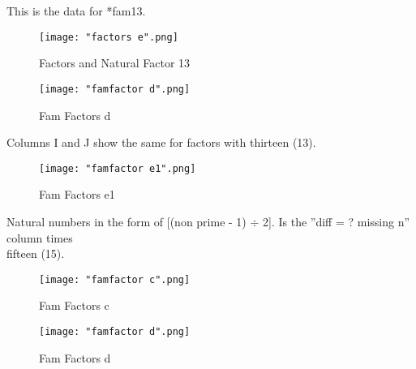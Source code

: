 
This is the data for *fam13.
\begin{figure}[h]
    \centering
    \texttt{[image: "factors e".png]}
    \caption{Factors and Natural Factor 13}
\end{figure}
\pagebreak













\begin{figure}[h]
    \centering
    \texttt{[image: "famfactor d".png]}
    \caption{Fam Factors d}
\end{figure}
\pagebreak


\par 
Columns I and J show the same for factors with thirteen (13).
\begin{figure}[h]
    \centering
    \texttt{[image: "famfactor e1".png]}
    \caption{Fam Factors e1}
\end{figure}
\pagebreak


\par 
Natural numbers in the form of  [(non prime - 1) $\div$ 2]. Is the ''diff = ? missing n'' column times
\\
fifteen (15).
\begin{figure}[h]
    \centering
    \texttt{[image: "famfactor c".png]}
    \caption{Fam Factors c}
\end{figure}
\pagebreak



\begin{figure}[h]
    \centering
    \texttt{[image: "famfactor d".png]}
    \caption{Fam Factors d}
\end{figure}
\pagebreak







